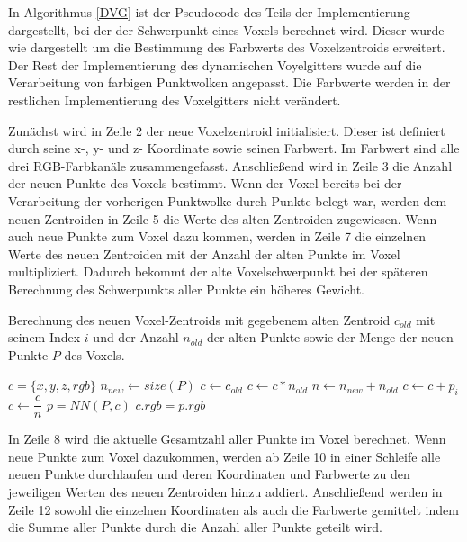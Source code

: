 In Algorithmus \ref{DVG} ist der Pseudocode des Teils der Implementierung dargestellt, bei der der Schwerpunkt eines Voxels berechnet wird. Dieser wurde wie dargestellt um die Bestimmung des Farbwerts des Voxelzentroids erweitert. Der Rest der Implementierung des dynamischen Voyelgitters wurde auf die Verarbeitung von farbigen Punktwolken angepasst. Die Farbwerte werden in der restlichen Implementierung des Voxelgitters nicht verändert.

Zunächst wird in Zeile 2 der neue Voxelzentroid initialisiert. Dieser ist definiert durch seine x-, y- und z- Koordinate sowie seinen Farbwert. Im Farbwert sind alle drei RGB-Farbkanäle zusammengefasst. Anschließend wird in Zeile 3 die Anzahl der neuen Punkte des Voxels bestimmt. Wenn der Voxel bereits bei der Verarbeitung der vorherigen Punktwolke durch Punkte belegt war, werden dem neuen Zentroiden in Zeile 5 die Werte des alten Zentroiden zugewiesen. Wenn auch neue Punkte zum Voxel dazu kommen, werden in Zeile 7 die einzelnen Werte des neuen Zentroiden mit der Anzahl der alten Punkte im Voxel multipliziert. Dadurch bekommt der alte Voxelschwerpunkt bei der späteren Berechnung des Schwerpunkts aller Punkte ein höheres Gewicht. 

\begin{algorithm}
	\caption{Berechnung des neuen Voxel-Zentroids mit gegebenem alten Zentroid $ c_{old} $ mit seinem Index $i$ und der Anzahl $n_{old}$ der alten Punkte sowie der Menge der neuen Punkte $P$ des Voxels.}
	\label{DVG}
	\begin{algorithmic}[1]
			\State $ c = \{x,y,z,rgb\} $
			\State $ n_{new} \leftarrow size(P)$
				\State $ c \leftarrow c_{old} $
					\State $c \leftarrow c*n_{old}$
				\EndIf 
			\EndIf 
			\State $ n \leftarrow n_{new} + n_{old} $
					\State $c \leftarrow c+p_i$
				\EndFor
				\State $c \leftarrow \dfrac{c}{n}$
					\State $ p = NN(P,c) $
					\State $ c.rgb = p.rgb $
				\EndIf	
			\EndIf
			\State {}
		\EndFunction
	\end{algorithmic}
\end{algorithm}

In Zeile 8 wird die aktuelle Gesamtzahl aller Punkte im Voxel berechnet. Wenn neue Punkte zum Voxel dazukommen, werden ab Zeile 10 in einer Schleife alle neuen Punkte durchlaufen und deren Koordinaten und Farbwerte zu den jeweiligen Werten des neuen Zentroiden hinzu addiert. Anschließend werden in Zeile 12 sowohl die einzelnen Koordinaten als auch die Farbwerte gemittelt indem die Summe aller Punkte durch die Anzahl aller Punkte geteilt wird. 

